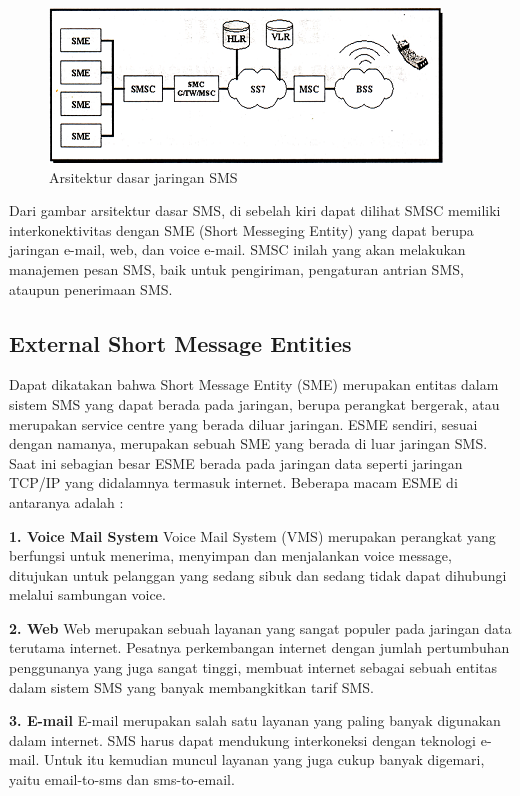 \documentclass{jtetiproposalskripsi}
\begin{document}
\begin{figure}[ht!]
  \centering
    \includegraphics{gambar/gambar5}
    \caption{Arsitektur dasar jaringan SMS}
    \label{jaringan SMS}
\end{figure}

Dari gambar arsitektur dasar SMS, di sebelah kiri dapat dilihat SMSC memiliki interkonektivitas dengan SME (Short Messeging Entity) yang dapat berupa jaringan e-mail, web, dan voice e-mail. SMSC inilah yang akan melakukan manajemen pesan SMS, baik untuk pengiriman, pengaturan antrian SMS, ataupun penerimaan SMS.

\subsection{External Short Message Entities}
Dapat dikatakan bahwa Short Message Entity (SME) merupakan entitas dalam sistem 	SMS yang dapat berada pada jaringan, berupa perangkat bergerak, atau merupakan service centre yang berada diluar jaringan. ESME sendiri, sesuai dengan namanya, merupakan sebuah SME yang berada di luar jaringan SMS. Saat ini sebagian besar ESME berada pada jaringan data seperti jaringan TCP/IP yang didalamnya  termasuk internet. Beberapa macam ESME di antaranya adalah :

\textbf{1.	Voice Mail System}
Voice Mail System (VMS) merupakan perangkat yang berfungsi untuk menerima, menyimpan dan menjalankan voice message, ditujukan untuk pelanggan yang sedang sibuk dan sedang tidak dapat dihubungi melalui sambungan voice.

\textbf{2.	Web}
Web merupakan sebuah layanan yang sangat populer pada jaringan data terutama internet. Pesatnya perkembangan internet dengan jumlah pertumbuhan penggunanya yang juga sangat tinggi, membuat internet sebagai sebuah entitas dalam sistem SMS yang banyak membangkitkan tarif SMS.

\textbf{3.	E-mail}
E-mail merupakan salah satu layanan yang paling banyak digunakan dalam internet. SMS harus dapat mendukung interkoneksi dengan teknologi e-mail. Untuk itu kemudian muncul layanan yang juga cukup banyak digemari, yaitu email-to-sms dan sms-to-email.
\end{document}
